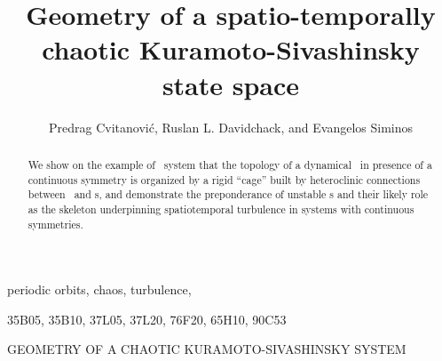 \documentclass{siamltex}
\begin{document}
                \title{
Geometry of a spatio-temporally chaotic Kuramoto-Sivashinsky state space
                 }
                  \author{
Predrag Cvitanovi\'c\footnotemark[1],
Ruslan L. Davidchack\footnotemark[2],
    and
Evangelos Siminos\footnotemark[1]
                    }


                \maketitle

\renewcommand{\thefootnote}{\fnsymbol{footnote}}
\renewcommand{\thefootnote}{\arabic{footnote}}

                \begin{abstract}
We show on the example of \KS\ system
that the topology of a dynamical \statesp\ in presence of
a continuous symmetry is organized by
a rigid ``cage'' built by heteroclinic connections
between \eqva\ and \rpo s, and demonstrate the
preponderance of unstable \rpo s and their likely
role as the skeleton underpinning spatiotemporal turbulence in
systems with continuous symmetries.
                \end{abstract}

\begin{keywords}
periodic orbits, chaos, turbulence, {\KSe}
\end{keywords}

\begin{AMS}
35B05, 35B10, 37L05, 37L20, 76F20, 65H10, 90C53
\end{AMS}

\pagestyle{myheadings}
\thispagestyle{plain}
         {GEOMETRY OF A CHAOTIC KURAMOTO-SIVASHINSKY SYSTEM}
\end{document}
